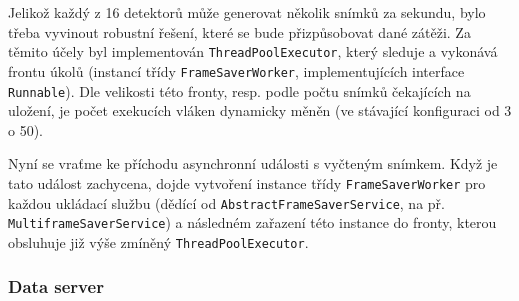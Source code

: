 Jelikož každý z 16 detektorů může generovat několik snímků za sekundu, bylo třeba vyvinout robustní řešení, které se bude přizpůsobovat dané zátěži. Za těmito účely byl implementován \texttt{ThreadPoolExecutor}, který sleduje a vykonává frontu úkolů (instancí třídy \texttt{FrameSaverWorker}, implementujících interface \texttt{Runnable}). Dle velikosti této fronty, resp. podle počtu snímků čekajících na uložení, je počet exekucích vláken dynamicky měněn (ve stávající konfiguraci od 3 o 50). 

Nyní se vraťme ke příchodu asynchronní události s vyčteným snímkem. Když je tato událost zachycena, dojde vytvoření instance třídy \texttt{FrameSaverWorker} pro každou ukládací službu (dědící od \texttt{AbstractFrameSaverService}, na př. \texttt{MultiframeSaverService}) a následném zařazení této instance do fronty, kterou obsluhuje již výše zmíněný \texttt{ThreadPoolExecutor}.


\clearpage
\subsubsection{Data server}\label{atlas:cont:output:dataserver}









